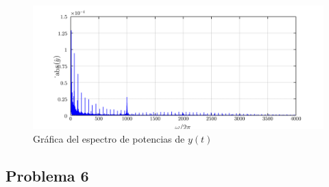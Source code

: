 \documentclass[a4paper,12pt,final]{article}
\begin{document}
      \begin{figure}[H]
        \begin{center}
          \caption{Gráfica del espectro de potencias de $y\left(t\right)$}
          \includegraphics[width=\textwidth]{./laboratorio_4/problema05_b.png}
        \end{center}
      \end{figure}

  \newpage
  \subsection*{Problema 6}
\end{document}
